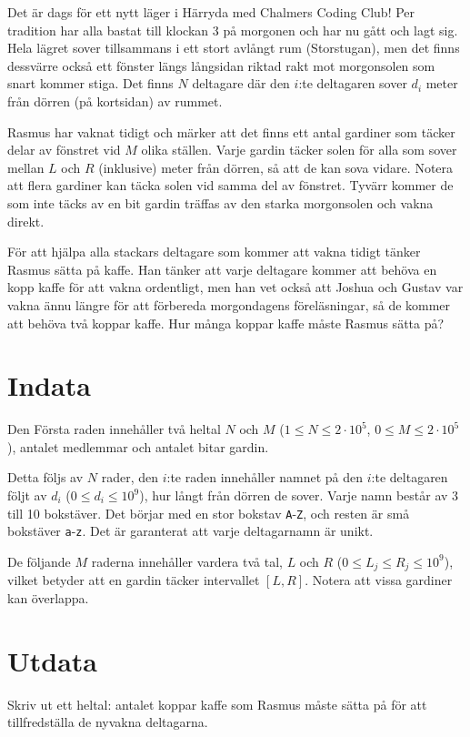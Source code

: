 
Det är dags för ett nytt läger i Härryda med Chalmers Coding Club! Per tradition har alla bastat till klockan 3 på
morgonen och har nu gått och lagt sig. Hela lägret sover tillsammans i ett stort avlångt rum (Storstugan), men det finns dessvärre
också ett fönster längs långsidan riktad rakt mot morgonsolen som snart kommer stiga. Det finns $N$ deltagare där den $i$:te deltagaren
sover $d_i$ meter från dörren (på kortsidan) av rummet.


Rasmus har vaknat tidigt och märker att det finns ett antal gardiner som täcker delar av fönstret vid $M$ olika ställen.
Varje gardin täcker solen för alla som sover mellan $L$ och $R$ (inklusive) meter från dörren, så att de kan sova vidare.
Notera att flera gardiner kan täcka solen vid samma del av fönstret.
Tyvärr kommer de som inte täcks av en bit gardin träffas av den starka morgonsolen och vakna direkt.

För att hjälpa alla stackars deltagare som kommer att vakna tidigt tänker Rasmus sätta på kaffe. Han tänker att varje
deltagare kommer att behöva en kopp kaffe för att vakna ordentligt, men han vet också att Joshua och Gustav
var vakna ännu längre för att förbereda morgondagens föreläsningar, så de kommer att behöva två koppar kaffe. Hur
många koppar kaffe måste Rasmus sätta på?


\section*{Indata}
Den Första raden innehåller två heltal $N$ och $M$ ($1 \le N \le 2 \cdot 10^5$, $0 \leq M \leq 2 \cdot 10^5$), antalet medlemmar och antalet bitar gardin.

Detta följs av $N$ rader, den $i$:te raden innehåller namnet på den $i$:te deltagaren följt av $d_i$ ($0 \le d_i \le 10^9$), hur långt
från dörren de sover. Varje namn består av 3 till 10 bokstäver. Det börjar med en stor bokstav \texttt{A}-\texttt{Z}, och resten är små bokstäver \texttt{a}-\texttt{z}.
Det är garanterat att varje deltagarnamn är unikt.

De följande $M$ raderna innehåller vardera två tal, $L$ och $R$ ($0 \le L_j \le R_j \le 10^9$),
vilket betyder att en gardin täcker intervallet $[L, R]$. Notera att vissa gardiner kan överlappa.

\section*{Utdata}
Skriv ut ett heltal: antalet koppar kaffe som Rasmus måste sätta på för att tillfredställa de nyvakna deltagarna.

